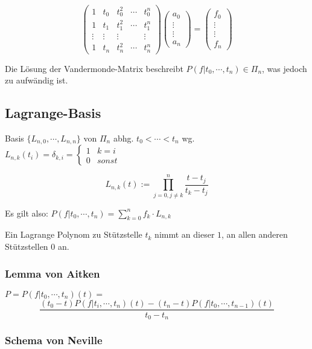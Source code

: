 $$\begin{pmatrix}
1      & t_0    & t_0^2  & \cdots & t_0^n  \\
1      & t_1    & t_1^2  & \cdots & t_1^n  \\
\vdots & \vdots & \vdots &        & \vdots \\
1      & t_n    & t_n^2  & \cdots & t_n^n
\end{pmatrix}
\begin{pmatrix}a_0 \\ \vdots \\ \vdots \\ a_n\end{pmatrix} =
\begin{pmatrix}f_0 \\ \vdots \\ \vdots \\ f_n\end{pmatrix}$$

Die Lösung der Vandermonde-Matrix beschreibt $P(f|t_0,\cdots,t_n) \in \Pi_n$, was jedoch zu aufwändig ist.

\subsection*{Lagrange-Basis}

Basis $\{L_{n,0},\cdots,L_{n,n}\}$ von $\Pi_n$ abhg. $t_0 < \cdots < t_n$ wg. $L_{n,k}(t_i) = \delta_{k,i} = \begin{cases}1 & k=i \\ 0 & sonst\end{cases}$

$$L_{n,k}(t) := \prod_{j=0,j\neq k}^n \frac{t-t_j}{t_k-t_j}$$

Es gilt also: $P(f|t_0,\cdots,t_n)=\sum_{k=0}^n f_k \cdot L_{n,k}$

\vspace{2mm}

Ein Lagrange Polynom zu Stützstelle $t_k$ nimmt an dieser $1$, an allen anderen Stützstellen $0$ an.

\subsubsection*{Lemma von Aitken}

$P = P(f|t_0,\cdots,t_n)(t) =$
\vspace{-2mm}
$$\frac{(t_0-t)P(f|t_i,\cdots,t_n)(t)-(t_n-t)P(f|t_0,\cdots,t_{n-1})(t)}{t_0-t_n}$$

\subsubsection*{Schema von Neville}

